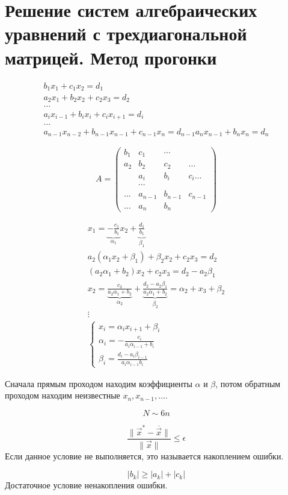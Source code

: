 \section{Решение систем алгебраических уравнений с трехдиагональной матрицей. Метод прогонки}

\begin{gather*}
  b_1 x_1 + c_1 x_2  = d_1\\
  a_2 x_1 + b_2 x_2 + c_2 x_3 = d_2 \\
  \dots \\
  a_i x_{i - 1} + b_i x_i + c_i x_{i + 1} = d_i \\
  \dots \\
  a_{n - 1} x_{n - 2} + b_{n - 1} x_{n - 1} + c_{n - 1} x_n = d_{n - 1}
  a_n x_{n - 1}+ b_n x_n = d_n
\end{gather*}

\[
  A =
  \begin{pmatrix}
    b_1 &c_1 &\cdots\\
    a_2 &b_2 &c_2 &\dots\\
    &a_i &b_i &c_i \dots\\
    &\cdots &\\
    \dots &a_{n - 1} &b_{n - 1} &c_{n - 1}\\
    \dots &a_n &b_n
  \end{pmatrix}
\]

\begin{gather*}
  x_1 = \underbrace{-\frac{c_1}{b_1}}_{\alpha_1} x_2 +
  \underbrace{\frac{d_1}{b_1}}_{\beta_1} \\
  a_2(\alpha_1 x_2 + \beta_1) + \beta_2 x_2 + c_2 x_3 = d_2 \\
  (a_2 \alpha_1 + b_2) x_2 + c_2 x_3 = d_2 - a_2 \beta_1 \\
  x_2 = \underbrace{\frac{c_2}{a_2\alpha_1 + b_2}}_{\alpha_2} + \underbrace{\frac{d_2 - a_2 \beta_1} {a_2 \alpha_1 +
    b_2}}_{\beta_2} = \alpha_2 + x_3 + \beta_2 \\
  \vdots\\
  \begin{cases}
    x_i = \alpha_i x_{i + 1} + \beta_i\\
    \alpha_i = - \frac{c_i}{a_i \alpha_{i - 1} + b_i} \\
    \beta_i = \frac{d_i - a_i \beta_{i - 1}}{a_i \alpha_{i - 1} b_i}
  \end{cases}
\end{gather*}

Сначала прямым проходом находим коэффициенты $\alpha$ и $\beta$, потом обратным
проходом находим неизвестные $x_n, x_{n - 1}, \dotsc$. 

\[
  N \sim 6n
\]

\begin{note}
  \[
    \frac{\|\vec{x}^* - \overline{\vec{x}}\|}{\|\vec{x}\|} \leq \epsilon
  \]
  Если данное условие не выполняется, это называется накоплением ошибки.
\end{note}

\begin{note}
  \[
    |b_k| \geq |a_k| + |c_k|
  \] 
  Достаточное условие ненакопления ошибки.
\end{note}